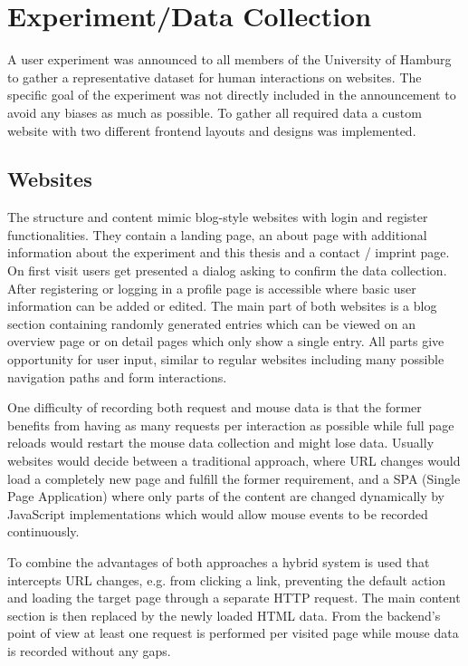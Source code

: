 \documentclass[
    fontsize=12pt,
    headings=small,
    parskip=half,           %
    bibliography=totoc,
    numbers=noenddot,       %
    open=any,               %
    final                   %
]{scrreprt}
\begin{document}
\section{Experiment/Data Collection}

A user experiment was announced to all members of the University of Hamburg to gather a representative dataset for human interactions on websites. The specific goal of the experiment was not directly included in the announcement to avoid any biases as much as possible. To gather all required data a custom website with two different frontend layouts and designs was implemented.

\subsection{Websites}

The structure and content mimic blog-style websites with login and register functionalities. They contain a landing page, an about page with additional information about the experiment and this thesis and a contact / imprint page. On first visit users get presented a dialog asking to confirm the data collection. After registering or logging in a profile page is accessible where basic user information can be added or edited. The main part of both websites is a blog section containing randomly generated entries which can be viewed on an overview page or on detail pages which only show a single entry.
All parts give opportunity for user input, similar to regular websites including many possible navigation paths and form interactions.

One difficulty of recording both request and mouse data is that the former benefits from having as many requests per interaction as possible while full page reloads would restart the mouse data collection and might lose data. Usually websites would decide between a traditional approach, where URL changes would load a completely new page and fulfill the former requirement, and a SPA (Single Page Application) where only parts of the content are changed dynamically by JavaScript implementations which would allow mouse events to be recorded continuously.

To combine the advantages of both approaches a hybrid system is used that intercepts URL changes, e.g. from clicking a link, preventing the default action and loading the target page through a separate HTTP request. The main content section is then replaced by the newly loaded HTML data. From the backend's point of view at least one request is performed per visited page while mouse data is recorded without any gaps.
\end{document}

